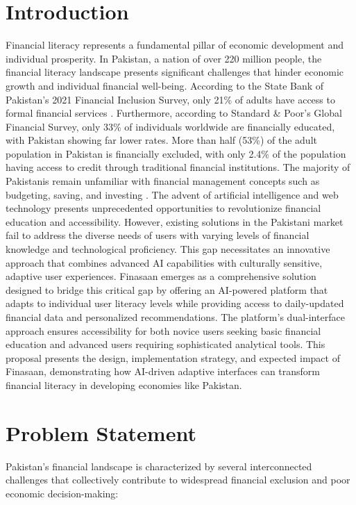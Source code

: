 \documentclass[12pt]{article}
\begin{document}
\section{Introduction}
Financial literacy represents a fundamental pillar of economic development and individual prosperity. In Pakistan, a nation of over 220 million people, the financial literacy landscape presents significant challenges that hinder economic growth and individual financial well-being. According to the State Bank of Pakistan's 2021 Financial Inclusion Survey, only 21\% of adults have access to formal financial services \cite{sbp2021,beltway2024,karandaaz2024}. Furthermore, according to Standard \& Poor's Global Financial Survey, only 33\% of individuals worldwide are financially educated, with Pakistan showing far lower rates. More than half (53\%) of the adult population in Pakistan is financially excluded, with only 2.4\% of the population having access to credit through traditional financial institutions. The majority of Pakistanis remain unfamiliar with financial management concepts such as budgeting, saving, and investing \cite{pafec2024}. The advent of artificial intelligence and web technology presents unprecedented opportunities to revolutionize financial education and accessibility. However, existing solutions in the Pakistani market fail to address the diverse needs of users with varying levels of financial knowledge and technological proficiency. This gap necessitates an innovative approach that combines advanced AI capabilities with culturally sensitive, adaptive user experiences. Finasaan emerges as a comprehensive solution designed to bridge this critical gap by offering an AI-powered platform that adapts to individual user literacy levels while providing access to daily-updated financial data and personalized recommendations. The platform's dual-interface approach ensures accessibility for both novice users seeking basic financial education and advanced users requiring sophisticated analytical tools. This proposal presents the design, implementation strategy, and expected impact of Finasaan, demonstrating how AI-driven adaptive interfaces can transform financial literacy in developing economies like Pakistan.

\section{Problem Statement}
Pakistan's financial landscape is characterized by several interconnected challenges that collectively contribute to widespread financial exclusion and poor economic decision-making:
\end{document}

